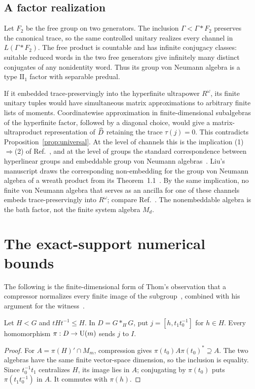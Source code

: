 \subsection{A factor realization}
Let $F_2$ be the free group on two generators. The inclusion $\Gamma<\Gamma*F_2$ preserves the canonical trace, so the same
controlled unitary realizes every channel in $L(\Gamma*F_2)$. The free product is
countable and has infinite conjugacy classes: suitable reduced words in the two free
generators give infinitely many distinct conjugates of any nonidentity word. Thus its group
von Neumann algebra is a type $\mathrm{II}_1$ factor with separable predual.

If it embedded trace-preservingly into the hyperfinite ultrapower $R^\omega$, its finite
unitary tuples would have simultaneous matrix approximations to arbitrary finite lists of
moments. Coordinatewise approximation in finite-dimensional subalgebras of the hyperfinite
factor, followed by a diagonal choice, would give a matrix-ultraproduct representation of
$\widehat D$ retaining the trace $\tau(j)=0$. This contradicts Proposition~\ref{prop:universal}.
At the level of channels this is the implication (1)$\Rightarrow$(2) of
Ref.~\cite[Theorem~3.6]{hm15}, and at the level of groups the standard correspondence between
hyperlinear groups and embeddable group von Neumann algebras~\cite[Proposition~7.1]{ozawa}.
Liu's manuscript draws the corresponding non-embedding for the group von Neumann algebra of a
wreath product from its Theorem~1.1~\cite{liu}. By the same implication, no finite von Neumann
algebra that serves as an ancilla for one of these channels embeds trace-preservingly into
$R^\omega$; compare Ref.~\cite[Corollary~3.11]{musat}. The nonembeddable algebra is the bath factor, not the
finite system algebra $M_d$.

\section{The exact-support numerical bounds}\label{sec:restricted}

The following is the finite-dimensional form of Thom's observation that a compressor
normalizes every finite image of the subgroup~\cite[Remark~4.4]{thom}, combined with his
argument for the witness~\cite[Section~5.2]{thom}.

\begin{lemma}\label{lem:finite-rigid}
Let $H<G$ and $tHt^{-1}\le H$. In $D=G*_HG$, put $j=[h,t_1t_0^{-1}]$ for $h\in H$.
Every homomorphism $\pi:D\to\operatorname{U}(m)$ sends $j$ to $I$.
\end{lemma}
\begin{proof}
For $A=\pi(H)'\cap M_m$, compression gives
$\pi(t_0)A\pi(t_0)^*\supseteq A$. The two algebras have the same finite vector-space
dimension, so the inclusion is equality. Since $t_0^{-1}t_1$ centralizes $H$, its image
lies in $A$; conjugating by $\pi(t_0)$ puts $\pi(t_1t_0^{-1})$ in $A$. It commutes with
$\pi(h)$.
\end{proof}

